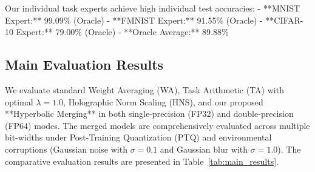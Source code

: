\documentclass{article}
\theoremstyle{plain}
\theoremstyle{definition}
\theoremstyle{remark}
\begin{document}
Our individual task experts achieve high individual test accuracies:
- **MNIST Expert:** 99.09\% (Oracle)
- **FMNIST Expert:** 91.55\% (Oracle)
- **CIFAR-10 Expert:** 79.00\% (Oracle)
- **Oracle Average:** 89.88\%

\subsection{Main Evaluation Results}
We evaluate standard Weight Averaging (WA), Task Arithmetic (TA) with optimal $\lambda = 1.0$, Holographic Norm Scaling (HNS), and our proposed **Hyperbolic Merging** in both single-precision (FP32) and double-precision (FP64) modes. The merged models are comprehensively evaluated across multiple bit-widths under Post-Training Quantization (PTQ) and environmental corruptions (Gaussian noise with $\sigma=0.1$ and Gaussian blur with $\sigma=1.0$). The comparative evaluation results are presented in Table~\ref{tab:main_results}.
\end{document}
